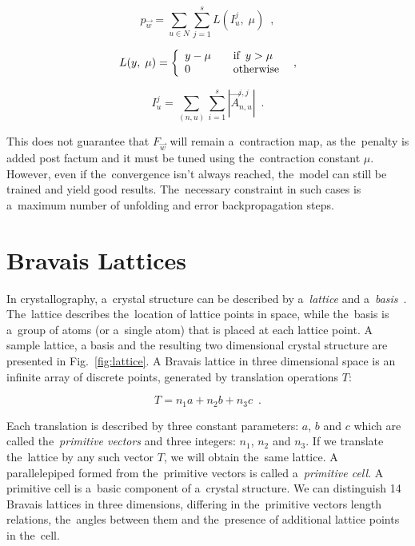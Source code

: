 \documentclass{llncs}
\begin{document}
\begin{equation}
p_{\vec{w}} = \sum_{u \in N} \sum_{j = 1}^{s} L(I_u^j, \; \mu) \enspace ,
\label{eq:gnn_pw}
\end{equation}

\begin{equation}
L(y, \; \mu) = \left\{
\begin{array}{l l}
	y - \mu		& \quad \mbox{if} \enspace y > \mu \\
	0			& \quad \mbox{otherwise}
\end{array} \right. \enspace ,
\label{eq:gnn_pw_L}
\end{equation}

\begin{equation}
I_u^j =  \sum_{(n, u)} \sum_{i = 1}^{s} |\vec{A}_{n, u}^{i, j}| \enspace .
\label{eq:gnn_pw_inf}
\end{equation}


\noindent This does not guarantee that $F_{\vec{w}}$ will remain a~contraction map, as the~penalty is added post factum and it must be tuned using the~contraction constant $\mu$. However, even if the~convergence isn't always reached, the~model can still be trained and yield good results. The~necessary constraint in such cases is a~maximum number of unfolding and error backpropagation steps.


\section{Bravais Lattices}
In crystallography, a~crystal structure can be described by a~\emph{lattice} and a~\emph{basis}~\cite{kittel1986introduction}. The~lattice describes the~location of lattice points in space, while the~basis is a~group of atoms (or a~single atom) that is placed at each lattice point. A sample lattice, a basis and the resulting two dimensional crystal structure are presented in Fig.~\ref{fig:lattice}. A Bravais lattice in three dimensional space is an infinite array of discrete points, generated by translation operations $T$:

\begin{equation}
T = n_1a + n_2b + n_3c \enspace .
\end{equation}

\noindent Each translation is described by three constant parameters: $a$, $b$ and $c$ which are called the~\emph{primitive vectors} and three integers: $n_1$, $n_2$ and $n_3$. If we translate the~lattice by any such vector $T$, we will obtain the~same lattice. A parallelepiped formed from the~primitive vectors is called a~\emph{primitive cell}. A primitive cell is a~basic component of a~crystal structure. We can distinguish 14 Bravais lattices in three dimensions, differing in the~primitive vectors length relations, the~angles between them and the~presence of additional lattice points in the~cell.
\\
\end{document}
